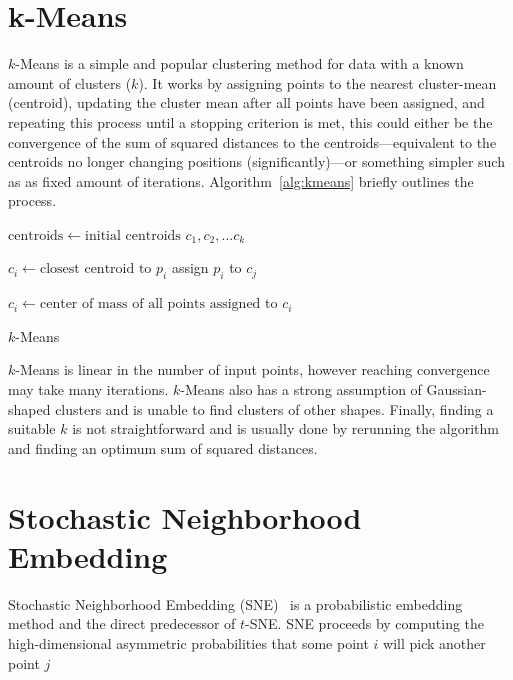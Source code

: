 \section{k-Means}

$k$-Means is a simple and popular clustering method for data with a known
amount of clusters ($k$). It works by assigning points to the nearest
cluster-mean (centroid), updating the cluster mean after all points have been
assigned, and repeating this process until a stopping criterion is met,
this could either be the convergence of the sum of squared distances to the centroids---equivalent
to the centroids no longer changing positions (significantly)---or something simpler such as as fixed amount of iterations. Algorithm~\ref{alg:kmeans}
briefly outlines the process.

\begin{algorithm}[tb]
    \begin{algorithmic}
      \State $\text{centroids} \gets \text{initial centroids } c_1, c_2, \ldots c_k$

          \State $c_i \gets \text{closest centroid to } p_i$
          \State assign $p_i$ to $c_j$
        \EndFor

          \State $c_i \gets \text{center of mass of all points assigned to } c_i$
        \EndFor
      \EndWhile
      \EndProcedure
    \end{algorithmic}
    \caption{$k$-Means}
    \label{alg:kmeans}
\end{algorithm}

$k$-Means is linear in the number of input points, however reaching convergence
may take many iterations. $k$-Means also has a strong assumption of
Gaussian-shaped clusters and is unable to find clusters of other shapes.
Finally, finding a suitable $k$ is not straightforward and is usually done by
rerunning the algorithm and finding an optimum sum of squared distances.

\section{Stochastic Neighborhood Embedding}

Stochastic Neighborhood Embedding (SNE)~\cite{sne} is a probabilistic
embedding method and the direct predecessor of $t$-SNE. SNE proceeds
by computing the high-dimensional asymmetric probabilities that
some point $i$ will pick another point $j$

